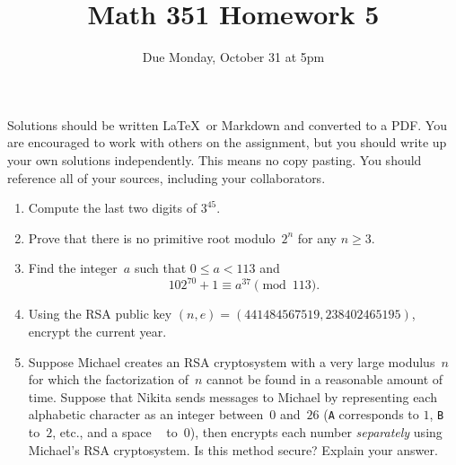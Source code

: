 \documentclass{article}
\title{Math 351 Homework 5}
\author{Due Monday, October 31 at 5pm}
\date{}
\newcommand{\con}{\equiv}
\begin{document}

\maketitle

\setlength{\parindent}{0em} %
\setlength{\parskip}{1em} %



Solutions should be written \LaTeX\ or Markdown and converted to a PDF. You are encouraged to work with others on the assignment, but you should write up your own solutions independently. This means no copy pasting. You should reference all of your sources, including your collaborators. 

\begin{enumerate}

	\item Compute the last two digits of $3^{45}$.

	\item Prove that there is no primitive root modulo~$2^n$ for any $n\geq 3$.

	\item Find the integer~$a$ such that $0\leq a < 113$ and
		\[
			102^{70}+1 \con a^{37}\pmod{113}.
		\]

	\item Using the RSA public key $(n,e) = (441484567519, 238402465195)$, encrypt the current year.

	\item Suppose Michael creates an RSA cryptosystem with a very large modulus~$n$ for which the factorization of~$n$ cannot be found in a reasonable amount of time. Suppose that Nikita sends messages to Michael by representing each alphabetic character as an integer between~$0$ and~$26$ (\verb*|A| corresponds to $1$, \verb*|B| to~$2$, etc., and a space \verb*| | to~$0$), then encrypts each number {\em separately} using Michael's RSA cryptosystem.  Is this method secure? Explain your answer.

\end{enumerate}
\end{document}
